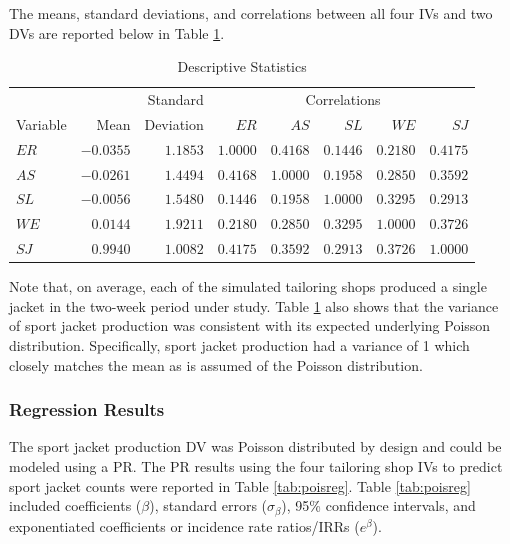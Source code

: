 \documentclass[man]{apa7}
\begin{document}
	The means, standard deviations, and correlations between all four IVs and two DVs are reported below in Table \ref{tab:desc}. 
	
	\begin{table}[h!]
		\centering
		\caption{\centering Descriptive Statistics} 
		\begin{tabular}{lrr|rrrrr}
			\hline 
			&  & Standard & \multicolumn{5}{c}{Correlations} \\ 
			Variable & Mean & Deviation & $ER$ & $AS$ & $SL$ & $WE$ & $SJ$ \\ 
			\hline
			$ER$ & $-0.0355$ & $1.1853$ & $1.0000$ & $0.4168$ & $0.1446$ & $0.2180$ & $0.4175$ \\ 
			$AS$ & $-0.0261$ & $1.4494$ & $0.4168$ & $1.0000$ & $0.1958$ & $0.2850$ & $0.3592$ \\ 
			$SL$ & $-0.0056$ & $1.5480$ & $0.1446$ & $0.1958$ & $1.0000$ & $0.3295$ & $0.2913$ \\ 
			$WE$ & $0.0144$ & $1.9211$ & $0.2180$ & $0.2850$ & $0.3295$ & $1.0000$ & $0.3726$ \\ 
			$SJ$ & $0.9940$ & $1.0082$ & $0.4175$ & $0.3592$ & $0.2913$ & $0.3726$ & $1.0000$ \\ 
			\hline 
		\end{tabular}
		\label{tab:desc}
	\end{table}
	
	Note that, on average, each of the simulated tailoring shops produced a single jacket in the two-week period under study.
	Table \ref{tab:desc} also shows that the variance of sport jacket production was consistent with its expected underlying Poisson distribution.
	Specifically, sport jacket production had a variance of 1 which closely matches the mean as is assumed of the Poisson distribution. 

		\subsubsection{Regression Results}
		
	The sport jacket production DV was Poisson distributed by design and could be modeled using a PR.
	The PR results using the four tailoring shop IVs to predict sport jacket counts were reported in Table \ref{tab:poisreg}. 
	Table \ref{tab:poisreg} included coefficients ($\beta$), standard errors ($\sigma_{\beta}$), 95\% confidence intervals, and exponentiated coefficients or incidence rate ratios/IRRs ($e^{\beta}$).
	
\end{document}
